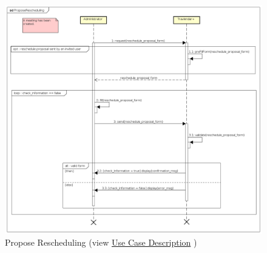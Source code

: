 \begin{figure}[H]
\centering\includegraphics[width=\textwidth]{Images/SequenceDiagrams/Admin/ProposeRescheduling.png}{}
\caption[Propose Rescheduling]{{Propose Rescheduling}\label{SeqDiagr:ProposeRes} (view \hyperref[UseCaseDescr:ProposeRes]{Use Case Description} )}
\end{figure}

\clearpage